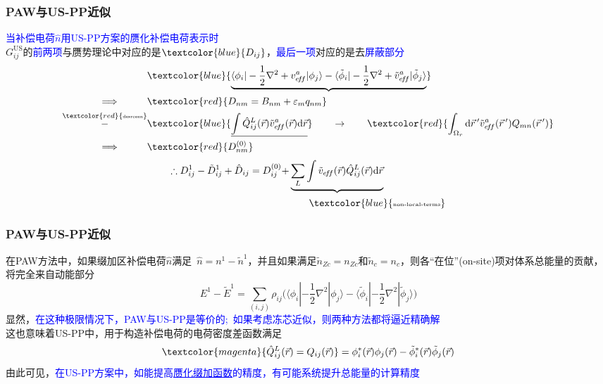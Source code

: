 \frame
{
	\frametitle{\textrm{PAW}与\textrm{US-PP}近似}
	\textcolor{blue}{当补偿电荷$\hat n$用\textrm{US-PP}方案的赝化补偿电荷表示时}\\%
	$G_{ij}^{\mathrm{US}}$的\textcolor{blue}{前两项}与赝势理论中对应的是$\textcolor{blue}{D_{ij}}$，\textcolor{blue}{最后一项}对应的是去\textcolor{blue}{屏蔽部分}
	\begin{displaymath}
		\begin{aligned}
			&\textcolor{blue}{\underbrace{\langle\phi_i|-\frac12\nabla^2+v_{e\!f\!f}^a|\phi_j\rangle-\langle\tilde\phi_i|-\frac12\nabla^2+\tilde v_{e\!f\!f}^a|\tilde\phi_j\rangle}}\\
			\Longrightarrow\quad\qquad&\textcolor{red}{D_{nm}=B_{nm}+\varepsilon_mq_{nm}} \\
			\overset{\textcolor{red}{\textrm{\fontsize{4.1pt}{3.9pt}\selectfont{desrceen}}}}{-}&\textcolor{blue}{\underline{\int\hat Q_{ij}^L(\vec r)\tilde v_{e\!f\!f}^a(\vec r)\mathrm{d}\vec r}} \qquad\rightarrow\qquad \textcolor{red}{\int_{\Omega_r}\mathrm{d}\vec r\,^{\prime}\tilde v_{e\!f\!f}^a(\vec r\,^{\prime})Q_{mn}(\vec r\,^{\prime})}\\
			\Longrightarrow\quad\qquad&\textcolor{red}{D_{nm}^{(0)}}
		\end{aligned}
	\end{displaymath}
	\begin{displaymath}
		\begin{aligned}
			\therefore D_{ij}^1-\tilde D_{ij}^1+\hat D_{ij}=D_{ij}^{(0)}+&\underbrace{\sum_L\int\tilde v_{e\!f\!f}(\vec r)\hat{Q}_{ij}^L(\vec r)\mathrm{d}\vec r}\\
			&\qquad{\textcolor{blue}{\fontsize{5.2pt}{4.2pt}\selectfont{\textrm{non-local-terms}}}}
		\end{aligned}
	\end{displaymath}
}

\frame
{
	\frametitle{\textrm{PAW}与\textrm{US-PP}近似}
	在\textrm{PAW}方法中，如果缀加区补偿电荷$\hat n$满足~$\hat n=n^1-\tilde n^1$，并且如果满足$\tilde n_{Zc}=n_{Zc}$和$\tilde n_c=n_c$，则各“在位”(\textrm{on-site})项对体系总能量的贡献，将完全来自动能部分
	\begin{displaymath}
		E^1-\tilde E^1=\sum_{(i,j)}\rho_{ij}\big(\langle\phi_i|-\frac12\nabla^2|\phi_j\rangle-\langle\tilde\phi_i|-\frac12\nabla^2|\tilde\phi_j\rangle\big)
	\end{displaymath}
	显然，\textcolor{blue}{在这种极限情况下，\textrm{PAW}与\textrm{US-PP}是等价的;~如果考虑冻芯近似，则两种方法都将逼近精确解}\\ 
	这也意味着\textrm{US-PP}中，用于构造补偿电荷的电荷密度差函数满足
	$$\textcolor{magenta}{\hat Q_{ij}^L(\vec r)=Q_{ij}(\vec r)}=\phi_i^{\ast}(\vec r)\phi_j(\vec r)-\tilde\phi_i^{\ast}(\vec r)\tilde\phi_j(\vec r)$$
	由此可见，\textcolor{blue}{在\textrm{US-PP}方案中，如能提高\underline{赝化缀加函数}的精度，有可能系统提升总能量的计算精度}

	{\fontsize{6.5pt}{3.9pt}}
}

